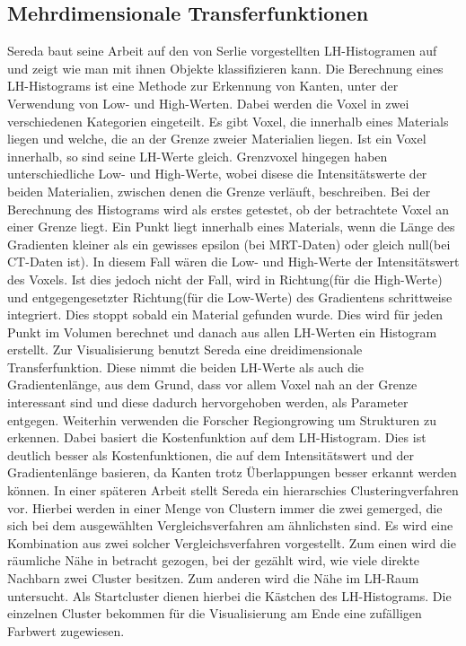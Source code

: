 \subsection{Mehrdimensionale Transferfunktionen}




Sereda baut seine Arbeit \cite{sereda2006visualization} auf den von Serlie \cite{serlie2003computed} vorgestellten LH-Histogramen auf und zeigt wie man mit ihnen Objekte klassifizieren kann. Die Berechnung eines LH-Histograms ist eine Methode zur Erkennung von Kanten, unter der Verwendung von Low- und High-Werten. Dabei werden die Voxel in zwei verschiedenen Kategorien eingeteilt. Es gibt Voxel, die  innerhalb eines Materials liegen und welche, die  an der Grenze zweier Materialien liegen. Ist ein Voxel innerhalb, so sind seine LH-Werte gleich. Grenzvoxel hingegen haben unterschiedliche Low- und High-Werte, wobei disese die Intensitätswerte der beiden Materialien, zwischen denen die Grenze verläuft, beschreiben. 
\newline
Bei der Berechnung des Histograms wird als erstes getestet, ob der betrachtete Voxel an einer Grenze liegt. Ein Punkt liegt innerhalb eines Materials, wenn  die Länge des Gradienten kleiner als ein gewisses epsilon (bei MRT-Daten) oder gleich null(bei CT-Daten ist). In diesem Fall wären die Low- und High-Werte der Intensitätswert des Voxels. Ist dies jedoch nicht der Fall, wird in Richtung(für die High-Werte) und entgegengesetzter Richtung(für die Low-Werte) des Gradientens schrittweise integriert. Dies stoppt sobald ein Material gefunden wurde. Dies wird für jeden Punkt im Volumen berechnet und danach aus allen LH-Werten ein Histogram erstellt.
\newline 
Zur Visualisierung benutzt Sereda eine dreidimensionale Transferfunktion. Diese nimmt die beiden LH-Werte als auch die Gradientenlänge, aus dem Grund, dass vor allem Voxel nah an der Grenze interessant sind und diese dadurch hervorgehoben werden, als Parameter entgegen.
\newline
Weiterhin verwenden die Forscher Regiongrowing um Strukturen zu erkennen. Dabei basiert die Kostenfunktion auf dem LH-Histogram. Dies ist deutlich besser als Kostenfunktionen, die auf dem Intensitätswert und der Gradientenlänge basieren, da Kanten trotz Überlappungen besser erkannt werden können.
\newline
\newline
In einer späteren Arbeit \cite{sereda2006automating} stellt Sereda ein hierarschies Clusteringverfahren vor. Hierbei werden in einer Menge von Clustern immer die zwei gemerged, die sich bei dem ausgewählten Vergleichsverfahren am ähnlichsten sind. Es wird eine Kombination aus zwei solcher Vergleichsverfahren vorgestellt. Zum einen wird die räumliche Nähe in betracht gezogen, bei der gezählt wird, wie viele direkte Nachbarn zwei Cluster besitzen. Zum anderen wird die Nähe im LH-Raum untersucht. Als Startcluster dienen hierbei die Kästchen des LH-Histograms. Die einzelnen Cluster bekommen für die Visualisierung am Ende eine zufälligen Farbwert zugewiesen. 



